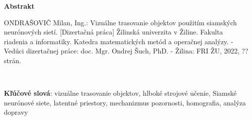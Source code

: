 \thispagestyle{plain}

\begin{center}
    \Large{\textbf{Abstrakt}}
\end{center}

\noindent ONDRAŠOVIČ Milan, Ing.: Vizuálne trasovanie objektov použitím siamských neurónových sietí.
[Dizertačná práca] Žilinská univerzita v Žiline. Fakulta riadenia a informatiky. Katedra matematických metód a operačnej analýzy. - Vedúci dizertačnej práce: doc. Mgr. Ondrej Šuch, PhD. - Žilina: FRI ŽU, 2022, ?? strán.

\


\noindent \textbf{Kľúčové slová}: vizuálne trasovanie objektov, hlboké strojové učenie, Siamské neurónové siete, latentné priestory, mechanizmus pozornosti, homografia, analýza dopravy

